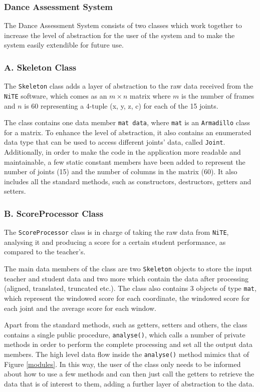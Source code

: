 \documentclass[11pt,a4paper]{article}
\begin{document}
\subsubsection*{Dance Assessment System}
\noindent 
The Dance Assessment System consists of two classes which work together to increase the level of abstraction for the user of the system and to make the system easily extendible for future use. 
\subsubsection*{A. Skeleton Class}
\noindent 
The \texttt{Skeleton} class adds a layer of abstraction to the raw data received from the \texttt{NiTE} software, which comes as an $m\times n $ matrix where $m$ is the number of frames and $n$ is 60 representing a 4-tuple (x, y, z, c) for each of the 15 joints.

\noindent
The class contains one data member \texttt{mat data}, where \texttt{mat} is an \texttt{Armadillo} class for a matrix. To enhance the level of abstraction, it also contains an enumerated data type that can be used to access different joints' data, called \texttt{Joint}. Additionally, in order to make the code in the application more readable and maintainable, a few static constant members have been added to represent the number of joints (15) and the number of columns in the matrix (60). It also includes all the standard methods, such as constructors, destructors, getters and setters.

\subsubsection*{B. ScoreProcessor Class}
\noindent
The \texttt{ScoreProcessor} class is in charge of taking the raw data from \texttt{NiTE}, analysing it and producing a score for a certain student performance, as compared to the teacher's.

\noindent 
The main data members of the class are two \texttt{Skeleton} objects to store the input teacher and student data and two more which contain the data after processing (aligned, translated, truncated etc.). The class also contains 3 objects of type \texttt{mat}, which represent the windowed score for each coordinate, the windowed score for each joint and the average score for each window.

\noindent
Apart from the standard methods, such as getters, setters and others, the class contains a single public procedure, \texttt{analyse()}, which calls a number of private methods in order to perform the complete processing and set all the output data members. The high level data flow inside the \texttt{analyse()} method mimics that of Figure \ref{modules}. In this way, the user of the class only needs to be informed about how to use a few methods and can then just call the getters to retrieve the data that is of interest to them, adding a further layer of abstraction to the data.
\end{document}
